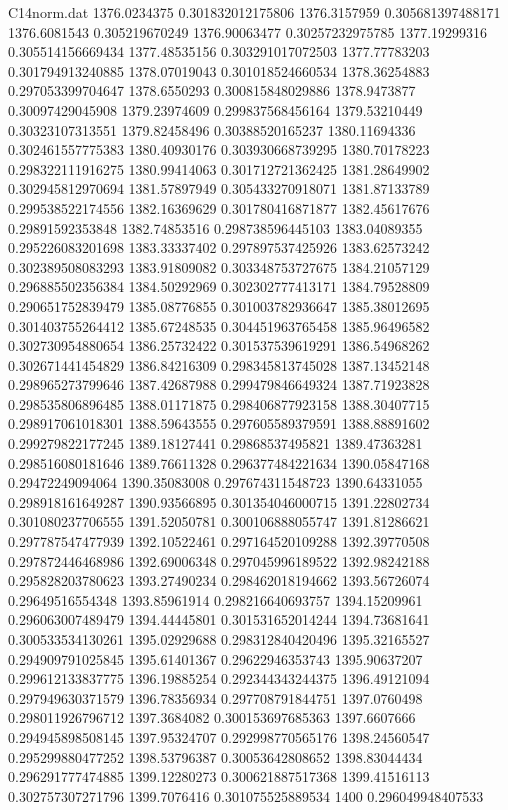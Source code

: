 \begin{filecontents}{C14norm.dat}
1376.0234375			0.301832012175806
1376.3157959			0.305681397488171
1376.6081543			0.305219670249
1376.90063477			0.30257232975785
1377.19299316			0.305514156669434
1377.48535156			0.303291017072503
1377.77783203			0.301794913240885
1378.07019043			0.301018524660534
1378.36254883			0.297053399704647
1378.6550293			0.300815848029886
1378.9473877			0.30097429045908
1379.23974609			0.299837568456164
1379.53210449			0.30323107313551
1379.82458496			0.30388520165237
1380.11694336			0.302461557775383
1380.40930176			0.303930668739295
1380.70178223			0.298322111916275
1380.99414063			0.301712721362425
1381.28649902			0.302945812970694
1381.57897949			0.305433270918071
1381.87133789			0.299538522174556
1382.16369629			0.301780416871877
1382.45617676			0.29891592353848
1382.74853516			0.298738596445103
1383.04089355			0.295226083201698
1383.33337402			0.297897537425926
1383.62573242			0.302389508083293
1383.91809082			0.303348753727675
1384.21057129			0.296885502356384
1384.50292969			0.302302777413171
1384.79528809			0.290651752839479
1385.08776855			0.301003782936647
1385.38012695			0.301403755264412
1385.67248535			0.304451963765458
1385.96496582			0.302730954880654
1386.25732422			0.301537539619291
1386.54968262			0.302671441454829
1386.84216309			0.298345813745028
1387.13452148			0.298965273799646
1387.42687988			0.299479846649324
1387.71923828			0.298535806896485
1388.01171875			0.298406877923158
1388.30407715			0.298917061018301
1388.59643555			0.297605589379591
1388.88891602			0.299279822177245
1389.18127441			0.29868537495821
1389.47363281			0.298516080181646
1389.76611328			0.296377484221634
1390.05847168			0.29472249094064
1390.35083008			0.297674311548723
1390.64331055			0.298918161649287
1390.93566895			0.301354046000715
1391.22802734			0.301080237706555
1391.52050781			0.300106888055747
1391.81286621			0.297787547477939
1392.10522461			0.297164520109288
1392.39770508			0.297872446468986
1392.69006348			0.297045996189522
1392.98242188			0.295828203780623
1393.27490234			0.298462018194662
1393.56726074			0.29649516554348
1393.85961914			0.298216640693757
1394.15209961			0.296063007489479
1394.44445801			0.301531652014244
1394.73681641			0.300533534130261
1395.02929688			0.298312840420496
1395.32165527			0.294909791025845
1395.61401367			0.29622946353743
1395.90637207			0.299612133837775
1396.19885254			0.292344343244375
1396.49121094			0.297949630371579
1396.78356934			0.297708791844751
1397.0760498			0.298011926796712
1397.3684082			0.300153697685363
1397.6607666			0.294945898508145
1397.95324707			0.292998770565176
1398.24560547			0.295299880477252
1398.53796387			0.30053642808652
1398.83044434			0.296291777474885
1399.12280273			0.300621887517368
1399.41516113			0.302757307271796
1399.7076416			0.301075525889534
1400			0.296049948407533


\end{filecontents}

